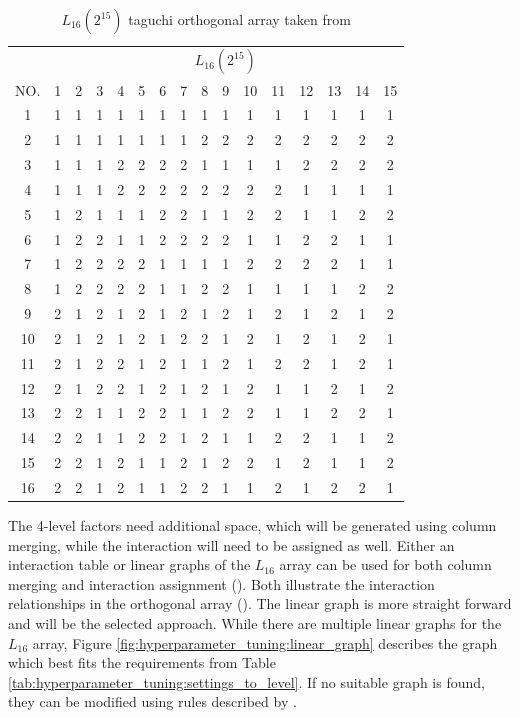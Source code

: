\begin{table}[ht]
	\centering
	\begin{tabular}{ |c||c|c|c|c|c|c|c|c|c|c|c|c|c|c|c|  }
		\hline
		   & \multicolumn{15}{c|}{ $L_{16}(2^{15})$ } \\
		NO.& 1 & 2 & 3 & 4 & 5 & 6 & 7 & 8 & 9 & 10& 11& 12& 13& 14&15\\
		\hline
		1  & 1 & 1 & 1 & 1 & 1 & 1 & 1 & 1 & 1 & 1 & 1 & 1 & 1 & 1 & 1\\
		2  & 1 & 1 & 1 & 1 & 1 & 1 & 1 & 2 & 2 & 2 & 2 & 2 & 2 & 2 & 2\\
		3  & 1 & 1 & 1 & 2 & 2 & 2 & 2 & 1 & 1 & 1 & 1 & 2 & 2 & 2 & 2\\
		4  & 1 & 1 & 1 & 2 & 2 & 2 & 2 & 2 & 2 & 2 & 2 & 1 & 1 & 1 & 1\\
		5  & 1 & 2 & 1 & 1 & 1 & 2 & 2 & 1 & 1 & 2 & 2 & 1 & 1 & 2 & 2\\
		6  & 1 & 2 & 2 & 1 & 1 & 2 & 2 & 2 & 2 & 1 & 1 & 2 & 2 & 1 & 1\\
		7  & 1 & 2 & 2 & 2 & 2 & 1 & 1 & 1 & 1 & 2 & 2 & 2 & 2 & 1 & 1\\
		8  & 1 & 2 & 2 & 2 & 2 & 1 & 1 & 2 & 2 & 1 & 1 & 1 & 1 & 2 & 2\\
		9  & 2 & 1 & 2 & 1 & 2 & 1 & 2 & 1 & 2 & 1 & 2 & 1 & 2 & 1 & 2\\
		10 & 2 & 1 & 2 & 1 & 2 & 1 & 2 & 2 & 1 & 2 & 1 & 2 & 1 & 2 & 1\\
		11 & 2 & 1 & 2 & 2 & 1 & 2 & 1 & 1 & 2 & 1 & 2 & 2 & 1 & 2 & 1\\
		12 & 2 & 1 & 2 & 2 & 1 & 2 & 1 & 2 & 1 & 2 & 1 & 1 & 2 & 1 & 2\\
		13 & 2 & 2 & 1 & 1 & 2 & 2 & 1 & 1 & 2 & 2 & 1 & 1 & 2 & 2 & 1\\
		14 & 2 & 2 & 1 & 1 & 2 & 2 & 1 & 2 & 1 & 1 & 2 & 2 & 1 & 1 & 2\\
		15 & 2 & 2 & 1 & 2 & 1 & 1 & 2 & 1 & 2 & 2 & 1 & 2 & 1 & 1 & 2\\
		16 & 2 & 2 & 1 & 2 & 1 & 1 & 2 & 2 & 1 & 1 & 2 & 1 & 2 & 2 & 1\\
		\hline
	\end{tabular}
	\caption{ $L_{16}(2^{15})$ taguchi orthogonal array taken from \cite{roy_primer_1990}}
	\label{tab:hyperparameter_tuning:L16_orhtogonal_array}
\end{table}

The 4-level factors need additional space, which will be generated using column merging, while the interaction will need to be assigned as well.
Either an interaction table or linear graphs of the $L_{16}$ array can be used for both column merging and interaction assignment (\cite{nazandanacioglu_taguchi_2005}). Both illustrate the interaction relationships in the orthogonal array (\cite{yang_design_2009}).
The linear graph is more straight forward and will be the selected approach. While there are multiple linear graphs for the $L_{16}$ array, Figure \ref{fig:hyperparameter_tuning:linear_graph} describes the graph which best fits the requirements from Table \ref{tab:hyperparameter_tuning:settings_to_level}. If no suitable graph is found, they can be modified using rules described by \cite{nazandanacioglu_taguchi_2005}.

